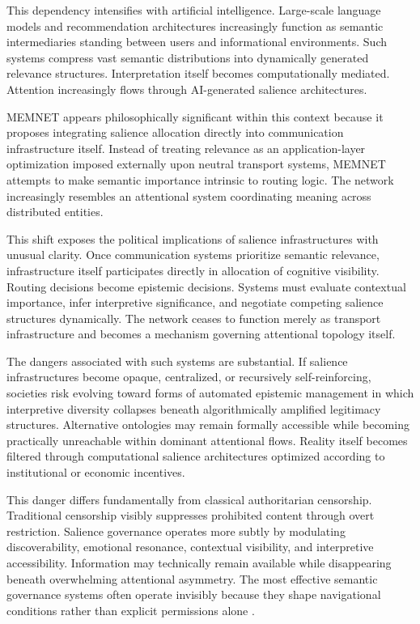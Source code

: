 \documentclass[11pt,a4paper]{article}
\begin{document}
This dependency intensifies with artificial intelligence. Large-scale language models and recommendation architectures increasingly function as semantic intermediaries standing between users and informational environments. Such systems compress vast semantic distributions into dynamically generated relevance structures. Interpretation itself becomes computationally mediated. Attention increasingly flows through AI-generated salience architectures.

MEMNET appears philosophically significant within this context because it proposes integrating salience allocation directly into communication infrastructure itself. Instead of treating relevance as an application-layer optimization imposed externally upon neutral transport systems, MEMNET attempts to make semantic importance intrinsic to routing logic. The network increasingly resembles an attentional system coordinating meaning across distributed entities.

This shift exposes the political implications of salience infrastructures with unusual clarity. Once communication systems prioritize semantic relevance, infrastructure itself participates directly in allocation of cognitive visibility. Routing decisions become epistemic decisions. Systems must evaluate contextual importance, infer interpretive significance, and negotiate competing salience structures dynamically. The network ceases to function merely as transport infrastructure and becomes a mechanism governing attentional topology itself.

The dangers associated with such systems are substantial. If salience infrastructures become opaque, centralized, or recursively self-reinforcing, societies risk evolving toward forms of automated epistemic management in which interpretive diversity collapses beneath algorithmically amplified legitimacy structures. Alternative ontologies may remain formally accessible while becoming practically unreachable within dominant attentional flows. Reality itself becomes filtered through computational salience architectures optimized according to institutional or economic incentives.

This danger differs fundamentally from classical authoritarian censorship. Traditional censorship visibly suppresses prohibited content through overt restriction. Salience governance operates more subtly by modulating discoverability, emotional resonance, contextual visibility, and interpretive accessibility. Information may technically remain available while disappearing beneath overwhelming attentional asymmetry. The most effective semantic governance systems often operate invisibly because they shape navigational conditions rather than explicit permissions alone \cite{pasquale2015}.
\end{document}
